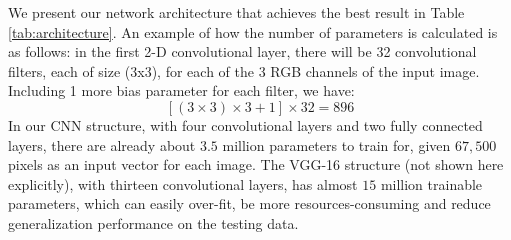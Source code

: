 \documentclass[journal, 12pt, onecolumn,draftclsnofoot]{IEEEtran}
\begin{document}
We present our network architecture that achieves the best result in Table \ref{tab:architecture}. An example of how the number of parameters is calculated is as follows: in the first 2-D convolutional layer, there will be 32 convolutional filters, each of size (3x3), for each of the 3 RGB channels of the input image. Including 1 more bias parameter for each filter, we have: \\
\[
[(3 \times 3) \times 3 + 1] \times 32 = 896
\]
In our CNN structure, with four convolutional layers and two fully connected layers, there are already about $3.5$ million parameters to train for, given $67,500$ pixels as an input vector for each image. The VGG-16 structure (not shown here explicitly), with thirteen convolutional layers, has almost $15$ million trainable parameters, which can easily over-fit, be more resources-consuming and reduce generalization performance on the testing data. 
\end{document}
